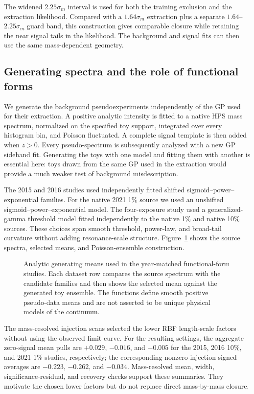 The widened $2.25\sigma_m$ interval is used for both the training exclusion
and the extraction likelihood.  Compared with a $1.64\sigma_m$ extraction plus a
separate $1.64$--$2.25\sigma_m$ guard band, this construction gives comparable
closure while retaining the near signal tails in the likelihood. The background and
signal fits can then use the same mass-dependent geometry.

\subsection{Generating spectra and the role of functional forms}

We generate the background pseudoexperiments independently of the GP used for their
extraction. A positive analytic intensity is fitted to a native HPS mass spectrum,
normalized on the specified toy support, integrated over every histogram bin, and
Poisson fluctuated.  A complete signal template is then added when $z>0$.  Every
pseudo-spectrum is subsequently analyzed with a new GP sideband fit. Generating the
toys with one model and fitting them with another is essential here: toys drawn from
the same GP used in the extraction would provide a much weaker test of background
misdescription.

The 2015 and 2016 studies used independently fitted shifted
sigmoid--power--exponential families. For the native 2021 1\% source we used an
unshifted sigmoid--power--exponential model. The four-exposure study used a
generalized-gamma threshold model fitted independently to the native 1\% and native
10\% sources. These choices span smooth threshold, power-law, and broad-tail
curvature without adding resonance-scale structure.  Figure~\ref{fig:v491-functional-form-seed-overview}
shows the source spectra, selected means, and Poisson-ensemble construction.

\begin{figure}[p]
\centering
{}
\caption{Analytic generating means used in the year-matched functional-form studies.
Each dataset row compares the source spectrum with the candidate families and then
shows the selected mean against the generated toy ensemble.  The functions define
smooth positive pseudo-data means and are not asserted to be unique physical models
of the continuum.}
\label{fig:v491-functional-form-seed-overview}
\end{figure}

The mass-resolved injection scans selected the lower RBF length-scale factors without
using the observed limit curve. For the resulting settings, the aggregate zero-signal
mean pulls are $+0.029$, $-0.016$, and $-0.005$ for the 2015, 2016 10\%, and 2021
1\% studies, respectively; the corresponding nonzero-injection signed averages are
$-0.223$, $-0.262$, and $-0.034$.  Mass-resolved mean, width,
significance-residual, and recovery checks support these summaries.  They motivate the
chosen lower factors but do not replace direct mass-by-mass
closure.

